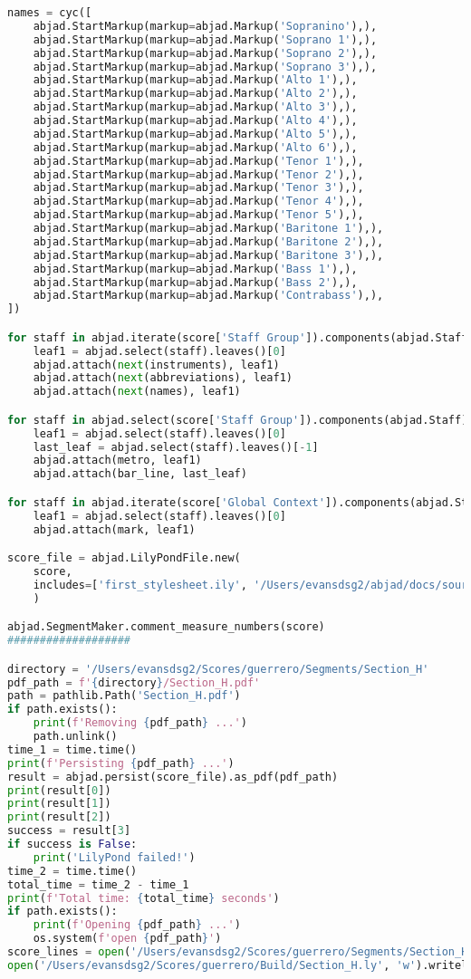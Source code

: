 \begin{lstlisting}[language=Python, caption=Invocation Source Code]
names = cyc([
    abjad.StartMarkup(markup=abjad.Markup('Sopranino'),),
    abjad.StartMarkup(markup=abjad.Markup('Soprano 1'),),
    abjad.StartMarkup(markup=abjad.Markup('Soprano 2'),),
    abjad.StartMarkup(markup=abjad.Markup('Soprano 3'),),
    abjad.StartMarkup(markup=abjad.Markup('Alto 1'),),
    abjad.StartMarkup(markup=abjad.Markup('Alto 2'),),
    abjad.StartMarkup(markup=abjad.Markup('Alto 3'),),
    abjad.StartMarkup(markup=abjad.Markup('Alto 4'),),
    abjad.StartMarkup(markup=abjad.Markup('Alto 5'),),
    abjad.StartMarkup(markup=abjad.Markup('Alto 6'),),
    abjad.StartMarkup(markup=abjad.Markup('Tenor 1'),),
    abjad.StartMarkup(markup=abjad.Markup('Tenor 2'),),
    abjad.StartMarkup(markup=abjad.Markup('Tenor 3'),),
    abjad.StartMarkup(markup=abjad.Markup('Tenor 4'),),
    abjad.StartMarkup(markup=abjad.Markup('Tenor 5'),),
    abjad.StartMarkup(markup=abjad.Markup('Baritone 1'),),
    abjad.StartMarkup(markup=abjad.Markup('Baritone 2'),),
    abjad.StartMarkup(markup=abjad.Markup('Baritone 3'),),
    abjad.StartMarkup(markup=abjad.Markup('Bass 1'),),
    abjad.StartMarkup(markup=abjad.Markup('Bass 2'),),
    abjad.StartMarkup(markup=abjad.Markup('Contrabass'),),
])

for staff in abjad.iterate(score['Staff Group']).components(abjad.Staff):
    leaf1 = abjad.select(staff).leaves()[0]
    abjad.attach(next(instruments), leaf1)
    abjad.attach(next(abbreviations), leaf1)
    abjad.attach(next(names), leaf1)

for staff in abjad.select(score['Staff Group']).components(abjad.Staff):
    leaf1 = abjad.select(staff).leaves()[0]
    last_leaf = abjad.select(staff).leaves()[-1]
    abjad.attach(metro, leaf1)
    abjad.attach(bar_line, last_leaf)

for staff in abjad.iterate(score['Global Context']).components(abjad.Staff):
    leaf1 = abjad.select(staff).leaves()[0]
    abjad.attach(mark, leaf1)

score_file = abjad.LilyPondFile.new(
    score,
    includes=['first_stylesheet.ily', '/Users/evansdsg2/abjad/docs/source/_stylesheets/abjad.ily'],
    )

abjad.SegmentMaker.comment_measure_numbers(score)
###################

directory = '/Users/evansdsg2/Scores/guerrero/Segments/Section_H'
pdf_path = f'{directory}/Section_H.pdf'
path = pathlib.Path('Section_H.pdf')
if path.exists():
    print(f'Removing {pdf_path} ...')
    path.unlink()
time_1 = time.time()
print(f'Persisting {pdf_path} ...')
result = abjad.persist(score_file).as_pdf(pdf_path)
print(result[0])
print(result[1])
print(result[2])
success = result[3]
if success is False:
    print('LilyPond failed!')
time_2 = time.time()
total_time = time_2 - time_1
print(f'Total time: {total_time} seconds')
if path.exists():
    print(f'Opening {pdf_path} ...')
    os.system(f'open {pdf_path}')
score_lines = open('/Users/evansdsg2/Scores/guerrero/Segments/Section_H/Section_H.ly').readlines()
open('/Users/evansdsg2/Scores/guerrero/Build/Section_H.ly', 'w').writelines(score_lines[15:-1])


\end{lstlisting}
